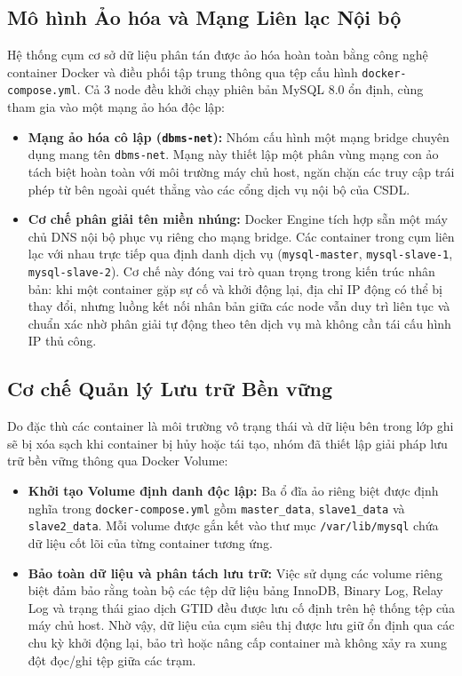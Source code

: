 \documentclass[12pt,a4paper]{report}
\begin{document}
\subsection{Mô hình Ảo hóa và Mạng Liên lạc Nội bộ}
Hệ thống cụm cơ sở dữ liệu phân tán được ảo hóa hoàn toàn bằng công nghệ container Docker và điều phối tập trung thông qua tệp cấu hình \texttt{docker-compose.yml}. Cả 3 node đều khởi chạy phiên bản MySQL 8.0 ổn định, cùng tham gia vào một mạng ảo hóa độc lập:
\begin{itemize}
    \item \textbf{Mạng ảo hóa cô lập (\texttt{dbms-net}):} Nhóm cấu hình một mạng bridge chuyên dụng mang tên \texttt{dbms-net}. Mạng này thiết lập một phân vùng mạng con ảo tách biệt hoàn toàn với môi trường máy chủ host, ngăn chặn các truy cập trái phép từ bên ngoài quét thẳng vào các cổng dịch vụ nội bộ của CSDL.
    \item \textbf{Cơ chế phân giải tên miền nhúng:} Docker Engine tích hợp sẵn một máy chủ DNS nội bộ phục vụ riêng cho mạng bridge. Các container trong cụm liên lạc với nhau trực tiếp qua định danh dịch vụ (\texttt{mysql-master}, \texttt{mysql-slave-1}, \texttt{mysql-slave-2}). Cơ chế này đóng vai trò quan trọng trong kiến trúc nhân bản: khi một container gặp sự cố và khởi động lại, địa chỉ IP động có thể bị thay đổi, nhưng luồng kết nối nhân bản giữa các node vẫn duy trì liên tục và chuẩn xác nhờ phân giải tự động theo tên dịch vụ mà không cần tái cấu hình IP thủ công.
\end{itemize}

\subsection{Cơ chế Quản lý Lưu trữ Bền vững}
Do đặc thù các container là môi trường vô trạng thái và dữ liệu bên trong lớp ghi sẽ bị xóa sạch khi container bị hủy hoặc tái tạo, nhóm đã thiết lập giải pháp lưu trữ bền vững thông qua Docker Volume:
\begin{itemize}
    \item \textbf{Khởi tạo Volume định danh độc lập:} Ba ổ đĩa ảo riêng biệt được định nghĩa trong \texttt{docker-compose.yml} gồm \texttt{master\_data}, \texttt{slave1\_data} và \texttt{slave2\_data}. Mỗi volume được gắn kết vào thư mục \texttt{/var/lib/mysql} chứa dữ liệu cốt lõi của từng container tương ứng.
    \item \textbf{Bảo toàn dữ liệu và phân tách lưu trữ:} Việc sử dụng các volume riêng biệt đảm bảo rằng toàn bộ các tệp dữ liệu bảng InnoDB, Binary Log, Relay Log và trạng thái giao dịch GTID đều được lưu cố định trên hệ thống tệp của máy chủ host. Nhờ vậy, dữ liệu của cụm siêu thị được lưu giữ ổn định qua các chu kỳ khởi động lại, bảo trì hoặc nâng cấp container mà không xảy ra xung đột đọc/ghi tệp giữa các trạm.
\end{itemize}
\end{document}
